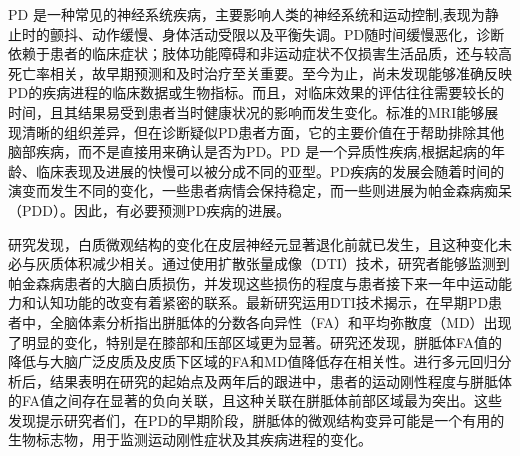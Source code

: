 PD 是一种常见的神经系统疾病，主要影响人类的神经系统和运动控制\cite{2020Comparison},表现为静止时的颤抖、动作缓慢、身体活动受限以及平衡失调\cite{ameiPhdthesis}。PD随时间缓慢恶化，诊断依赖于患者的临床症状；肢体功能障碍和非运动症状不仅损害生活品质，还与较高死亡率相关，故早期预测和及时治疗至关重要\cite{agosta2015propagation}。至今为止，尚未发现能够准确反映PD的疾病进程的临床数据或生物指标\cite{ameiPhdthesis}。而且，对临床效果的评估往往需要较长的时间，且其结果易受到患者当时健康状况的影响而发生变化\cite{ameiPhdthesis}。标准的MRI能够展现清晰的组织差异，但在诊断疑似PD患者方面，它的主要价值在于帮助排除其他脑部疾病，而不是直接用来确认是否为PD\cite{post2008clinical}。PD 是一个异质性疾病,根据起病的年龄、临床表现及进展的快慢可以被分成不同的亚型\cite{thenganatt2014parkinson,rajput2009course}。PD疾病的发展会随着时间的演变而发生不同的变化，一些患者病情会保持稳定，而一些则进展为帕金森病痴呆（PDD）。因此，有必要预测PD疾病的进展。

研究发现，白质微观结构的变化在皮层神经元显著退化前就已发生，且这种变化未必与灰质体积减少相关\cite{ameiPhdthesis}。通过使用扩散张量成像（DTI）技术，研究者能够监测到帕金森病患者的大脑白质损伤，并发现这些损伤的程度与患者接下来一年中运动能力和认知功能的改变有着紧密的联系\cite{ameiPhdthesis,schwarz2013diffusion}。最新研究运用DTI技术揭示，在早期PD患者中，全脑体素分析指出胼胝体的分数各向异性（FA）和平均弥散度（MD）出现了明显的变化，特别是在膝部和压部区域更为显著\cite{amandola2022longitudinal}。研究还发现，胼胝体FA值的降低与大脑广泛皮质及皮质下区域的FA和MD值降低存在相关性\cite{amandola2022longitudinal}。进行多元回归分析后，结果表明在研究的起始点及两年后的跟进中，患者的运动刚性程度与胼胝体的FA值之间存在显著的负向关联，且这种关联在胼胝体前部区域最为突出。这些发现提示研究者们，在PD的早期阶段，胼胝体的微观结构变异可能是一个有用的生物标志物，用于监测运动刚性症状及其疾病进程的变化\cite{amandola2022longitudinal}。

